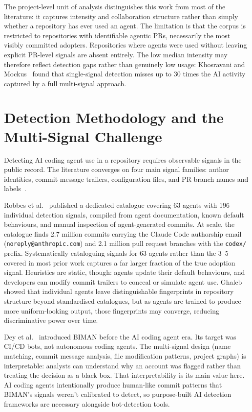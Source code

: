 The project-level unit of analysis distinguishes this work from most of the literature: it captures intensity and collaboration structure rather than simply whether a repository has ever used an agent. The limitation is that the corpus is restricted to repositories with identifiable agentic PRs, necessarily the most visibly committed adopters. Repositories where agents were used without leaving explicit PR-level signals are absent entirely. The low median intensity may therefore reflect detection gaps rather than genuinely low usage: Khosravani and Mockus~\cite{khosravani2026} found that single-signal detection misses up to 30 times the AI activity captured by a full multi-signal approach.

\section{Detection Methodology and the Multi-Signal Challenge}
\label{sec:lr:detection}

Detecting AI coding agent use in a repository requires observable signals in the public record. The literature converges on four main signal families: author identities, commit message trailers, configuration files, and PR branch names and labels~\cite{robbesHeuristics2026, galsterConfig2026, khosravani2026}.

Robbes et al.~\cite{robbesHeuristics2026} published a dedicated catalogue covering 63 agents with 196 individual detection signals, compiled from agent documentation, known default behaviours, and manual inspection of agent-generated commits. At scale, the catalogue finds 2.7 million commits carrying the Claude Code authorship email (\texttt{noreply@anthropic.com}) and 2.1 million pull request branches with the \texttt{codex/} prefix. Systematically cataloguing signals for 63 agents rather than the 3--5 covered in most prior work captures a far larger fraction of the true adoption signal. Heuristics are static, though: agents update their default behaviours, and developers can modify commit trailers to conceal or simulate agent use. Ghaleb~\cite{ghaleb2026} showed that individual agents leave distinguishable fingerprints in repository structure beyond standardised catalogues, but as agents are trained to produce more uniform-looking output, those fingerprints may converge, reducing discriminative power over time.

Dey et al.~\cite{dey2020biman} introduced BIMAN before the AI coding agent era. Its target was CI/CD bots, not autonomous coding agents. The multi-signal design (name matching, commit message analysis, file modification patterns, project graphs) is interpretable: analysts can understand why an account was flagged rather than treating the decision as a black box. That interpretability is its main value here. AI coding agents intentionally produce human-like commit patterns that BIMAN's signals weren't calibrated to detect, so purpose-built AI detection frameworks are necessary alongside bot-detection tools.

